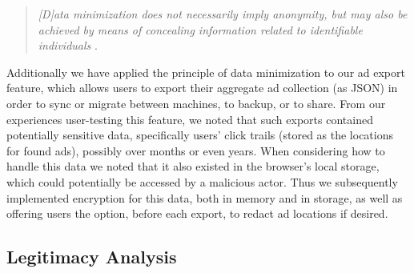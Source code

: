 \documentclass[conference]{IEEEtran}
\begin{document}

\vspace{2mm}
\blockquote{\emph{[D]ata minimization does not necessarily imply anonymity, but may also be achieved by means of concealing information related to identifiable individuals} \cite{Gurses-0}.}
\vspace{1mm}

\noindent Additionally we have applied the principle of data minimization to our ad export feature, which allows users to export their aggregate ad collection (as JSON) in order to sync or migrate between machines, to backup, or to share. From our experiences user-testing this feature, we noted that such exports contained potentially sensitive data, specifically users' click trails (stored as the locations for found ads), possibly over months or even years. When considering how to handle this data we noted that it also existed in the browser's local storage, which could potentially be accessed by a malicious actor. Thus we subsequently implemented encryption for this data, both in memory and in storage, as well as offering users the option, before each export, to redact ad locations if desired.

\subsection{Legitimacy Analysis}
\end{document}
